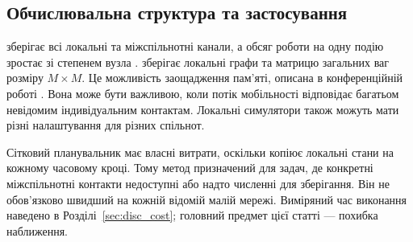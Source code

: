 \subsection{Обчислювальна структура та застосування}
\label{sec:cost}

\Full{} зберігає всі локальні та міжспільнотні канали, а обсяг роботи на одну подію зростає зі степенем вузла \citep{kuryliak2025simulating}. \TS{} зберігає локальні графи та матрицю загальних ваг розміру $M\times M$. Це можливість заощадження пам'яті, описана в конференційній роботі \citep{kuryliak2025towards}. Вона може бути важливою, коли потік мобільності відповідає багатьом невідомим індивідуальним контактам. Локальні симулятори також можуть мати різні налаштування для різних спільнот.

Сітковий планувальник має власні витрати, оскільки копіює локальні стани на кожному часовому кроці. Тому метод призначений для задач, де конкретні міжспільнотні контакти недоступні або надто численні для зберігання. Він не обов'язково швидший на кожній відомій малій мережі. Виміряний час виконання наведено в Розділі~\ref{sec:disc_cost}; головний предмет цієї статті --- похибка наближення.

\clearpage
\endgroup

